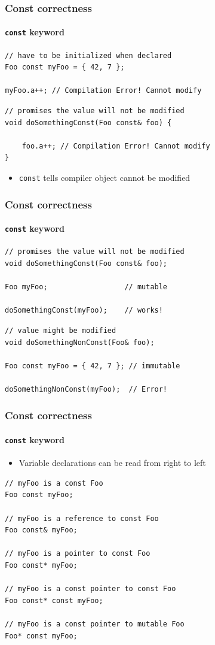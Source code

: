 \documentclass[table]{beamer}
\newcommand{\declarelesson}{\textbf{\color{themegreen}{Lesson:}} }
\begin{document}
\begin{frame}[fragile]
    \frametitle{\declarelesson Const correctness}
    \framesubtitle{\texttt{const} keyword}
    \begin{lstlisting}[title=Variables can be declared \texttt{const}]
// have to be initialized when declared
Foo const myFoo = { 42, 7 }; 

myFoo.a++; // Compilation Error! Cannot modify
    \end{lstlisting}
    \begin{lstlisting}[title=Function declaration]
// promises the value will not be modified
void doSomethingConst(Foo const& foo) {

    foo.a++; // Compilation Error! Cannot modify
}
    \end{lstlisting}
    \begin{itemize}
        \item \texttt{const} tells compiler object cannot be modified
    \end{itemize}
\end{frame}

\begin{frame}[fragile]
    \frametitle{\declarelesson Const correctness}
    \framesubtitle{\texttt{const} keyword}
    \begin{lstlisting}[title=Mutable objects can be used as const arguments]
// promises the value will not be modified
void doSomethingConst(Foo const& foo);

Foo myFoo;                  // mutable

doSomethingConst(myFoo);    // works!
    \end{lstlisting}
    \begin{lstlisting}[title=Immutable objects cannot be used as non-const arguments]
// value might be modified
void doSomethingNonConst(Foo& foo);

Foo const myFoo = { 42, 7 }; // immutable

doSomethingNonConst(myFoo);  // Error!
    \end{lstlisting}
\end{frame}

\begin{frame}[fragile]
    \frametitle{\declarelesson Const correctness}
    \framesubtitle{\texttt{const} keyword}
    \begin{itemize}
        \item Variable declarations can be read from right to left
    \end{itemize}
    \begin{lstlisting}[title=const Pointers and references]
// myFoo is a const Foo
Foo const myFoo; 

// myFoo is a reference to const Foo
Foo const& myFoo; 

// myFoo is a pointer to const Foo
Foo const* myFoo; 

// myFoo is a const pointer to const Foo
Foo const* const myFoo; 

// myFoo is a const pointer to mutable Foo
Foo* const myFoo; 
    \end{lstlisting}
\end{frame}
\end{document}
